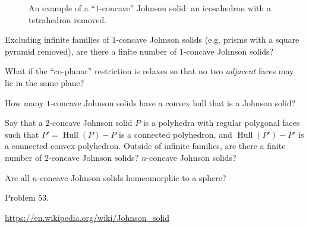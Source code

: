\documentclass{article}
\begin{document}
\begin{figure}[ht!]
  \caption{An example of a ``$1$-concave'' Johnson solid: an icosahedron with a tetrahedron removed.}
\end{figure}

\begin{question}
  Excluding infinite families of $1$-concave Johnson solids
  (e.g. prisms with a square pyramid removed),
  are there a finite number of $1$-concave Johnson solids?
\end{question}

\begin{related}
  \item What if the ``co-planar'' restriction is relaxes so that no two
    \textit{adjacent} faces may lie in the same plane?
  \item How many $1$-concave Johnson solids have a convex hull that is a
    Johnson solid?
  \item Say that a $2$-concave Johnson solid $P$ is a polyhedra with regular
    polygonal faces such that
    $P' = \operatorname{Hull}(P) - P$ is a connected polyhedron, and
    $\operatorname{Hull}(P') - P'$ is a connected convex polyhedron.
    Outside of infinite families,
    are there a finite number of $2$-concave Johnson solids?
    $n$-concave Johnson solids?
  \item Are all $n$-concave Johnson solids homeomorphic to a sphere?
\end{related}

\begin{references}
  \item Problem 53.
  \item \url{https://en.wikipedia.org/wiki/Johnson_solid}
\end{references}
\end{document}
